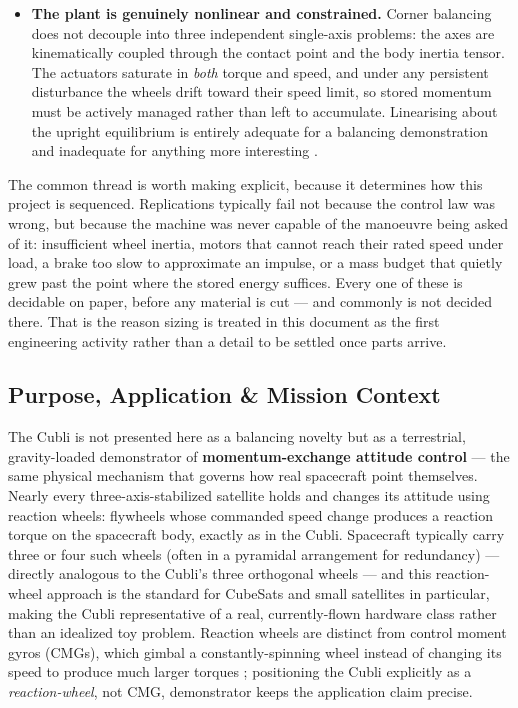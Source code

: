 \begin{itemize}
    \item \textbf{The plant is genuinely nonlinear and constrained.} Corner balancing does not decouple into three independent single-axis problems: the axes are kinematically coupled through the contact point and the body inertia tensor. The actuators saturate in \emph{both} torque and speed, and under any persistent disturbance the wheels drift toward their speed limit, so stored momentum must be actively managed rather than left to accumulate. Linearising about the upright equilibrium is entirely adequate for a balancing demonstration and inadequate for anything more interesting \cite{muehlebach2017cubli}.
\end{itemize}

The common thread is worth making explicit, because it determines how this project is sequenced. Replications typically fail not because the control law was wrong, but because the machine was never capable of the manoeuvre being asked of it: insufficient wheel inertia, motors that cannot reach their rated speed under load, a brake too slow to approximate an impulse, or a mass budget that quietly grew past the point where the stored energy suffices. Every one of these is decidable on paper, before any material is cut --- and commonly is not decided there. That is the reason sizing is treated in this document as the first engineering activity rather than a detail to be settled once parts arrive.

\subsection{Purpose, Application \& Mission Context}
\label{sec:application}

The Cubli is not presented here as a balancing novelty but as a terrestrial, gravity-loaded demonstrator of \textbf{momentum-exchange attitude control} — the same physical mechanism that governs how real spacecraft point themselves. Nearly every three-axis-stabilized satellite holds and changes its attitude using reaction wheels: flywheels whose commanded speed change produces a reaction torque on the spacecraft body, exactly as in the Cubli. Spacecraft typically carry three or four such wheels (often in a pyramidal arrangement for redundancy) — directly analogous to the Cubli's three orthogonal wheels — and this reaction-wheel approach is the standard for CubeSats and small satellites in particular, making the Cubli representative of a real, currently-flown hardware class rather than an idealized toy problem. Reaction wheels are distinct from control moment gyros (CMGs), which gimbal a constantly-spinning wheel instead of changing its speed to produce much larger torques \cite{votel2012cmgvsrw}; positioning the Cubli explicitly as a \emph{reaction-wheel}, not CMG, demonstrator keeps the application claim precise.

